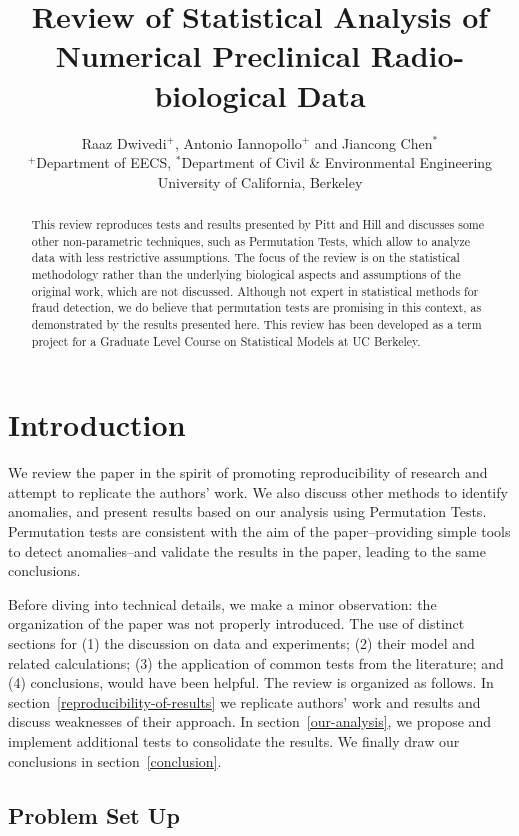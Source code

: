 \documentclass{article}
\title{Review of Statistical Analysis of Numerical Preclinical Radio-biological Data}
\author{Raaz Dwivedi$^+$,  Antonio Iannopollo$^+$ and Jiancong Chen$^*$ \\
    $^+$Department of EECS, $^*$Department of Civil \& Environmental Engineering \\
    University of California, Berkeley}
\begin{document}
    \maketitle



\begin{abstract}
This review reproduces tests and results
presented by Pitt and Hill and discusses some other non-parametric techniques, such as Permutation Tests, which allow to analyze data with less restrictive assumptions.
The focus of the review is on the statistical methodology rather than the underlying biological aspects and assumptions of the original work, which are not discussed.
Although not expert in statistical methods for fraud detection, we do believe that permutation tests are promising in this context, as demonstrated by the results presented here.
This review has been developed as a term
project for a Graduate Level Course on Statistical Models at UC Berkeley.
\end{abstract}

\section{Introduction} %
\label{sec:introduction}


We review the paper in the spirit of promoting reproducibility of research and attempt to replicate the authors' work. We also discuss other methods to identify anomalies, and present results based on our analysis using Permutation Tests. 
Permutation tests are consistent with the aim of the paper--providing simple tools to detect anomalies--and validate the results in the paper, leading to the same conclusions.

Before diving into technical details, we make a minor observation: the organization of the paper was not properly introduced. The use of distinct sections for (1) the discussion on data and experiments; (2) their model and related calculations; (3) the application of common tests from the literature; and (4) conclusions, would have been helpful. The review is organized as follows. In section~\ref{reproducibility-of-results} we replicate authors' work and results and discuss weaknesses of their approach.
In section~\ref{our-analysis}, we propose and implement additional tests to consolidate the results.
We finally draw our conclusions in section~\ref{conclusion}.


\subsection{Problem Set Up}\label{problem-set-up}
\end{document}
